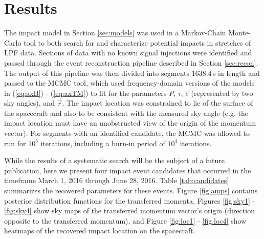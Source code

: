 \documentclass[a4paper]{jpconf}
\begin{document}
\section{Results}
\label{sec:results}

The impact model in Section \ref{sec:models} was used in a Markov-Chain Monte-Carlo tool to both search for and characterize potential impacts in stretches of LPF data. Sections of data with no known signal injections were identified and passed through the event reconstruction pipeline described in Section \ref{sec:recon}.  The output of this pipeline was then divided into segments $1638.4\,$s in length and passed to the MCMC tool, which used frequency-domain versions of the models in (\ref{eq:axB}) - (\ref{eq:axTM}) to fit for the parameters $P$, $\tau$, $\hat{e}$ (represented by two sky angles), and $\vec{r}$. The impact location was constrained to lie of the surface of the spacecraft and also to be consistent with the measured sky angle (e.g. the impact location must have an unobstructed view of the origin of the momentum vector). For segments with an identified candidate, the MCMC was allowed to run for $10^5$ iterations, including a burn-in period of $10^4$ iterations.
\par

While the results of a systematic search will be the subject of a future publication, here we present four impact event candidates that occurred in the timeframe March 1, 2016 through June 28, 2016. Table \ref{tab:candidates} summarizes the recovered parameters for these events. Figure \ref{fig:amps} contains posterior distribution functions for the transferred momenta, Figures \ref{fig:sky1} - \ref{fig:sky4} show sky maps of the transferred momentum vector's origin (direction opposite to the transferred momentum), and Figure \ref{fig:loc1} - \ref{fig:loc4} show heatmaps of the recovered impact location on the spacecraft.
\end{document}
